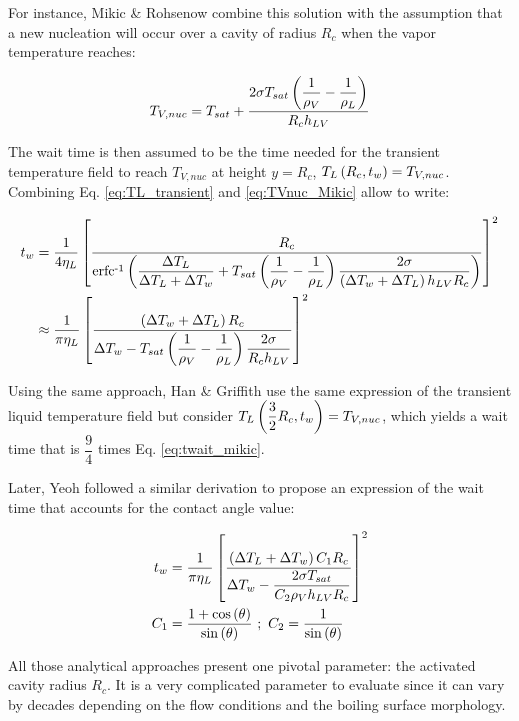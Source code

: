 For instance, Mikic \& Rohsenow \cite{mikic_bubble_1970} combine this solution with the assumption that a new nucleation will occur over a cavity of radius $R_{c}$ when the vapor temperature reaches:

\begin{equation}
T_{V,nuc} = T_{sat} + \frac{2\sigma T_{sat} \left( \dfrac{1}{\rho_{V}} - \dfrac{1}{\rho_{L}}  \right)}{R_{c}h_{LV}}
\label{eq:TVnuc_Mikic} 
\end{equation} 

The wait time is then assumed to be the time needed for the transient temperature field to reach $T_{V,nuc}$ at height $y=R_{c}$, \ie $T_{L}\left( R_{c},t_{w} \right)=T_{V,nuc}$. Combining Eq. \ref{eq:TL_transient} and \ref{eq:TVnuc_Mikic} allow to write:

\begin{align}
t_{w} &= \frac{1}{4\eta_{L}} \crocht{ \frac{R_{c}}{\erfcrec{ \dfrac{\Delta T_{L}}{\Delta T_{L} + \Delta T_{w}} + T_{sat} \parth{\dfrac{1}{\rho_{V}} - \dfrac{1}{\rho_{L}}}\dfrac{2\sigma }{ \parth{\Delta T_{w} + \Delta T_{L}}h_{LV}R_{c} } } } }^{2}\\
%
& \approx \frac{1}{\pi \eta_{L}}\crocht{\frac{ \parth{\Delta T_{w} + \Delta T_{L}}R_{c} }{\Delta T_{w} - T_{sat} \parth{\dfrac{1}{\rho_{V}} - \dfrac{1}{\rho_{L}}}\dfrac{2\sigma  }{R_{c} h_{LV}} } }^{2}
\label{eq:twait_mikic}
\end{align}

Using the same approach, Han \& Griffith \cite{chi-yeh_mechanism_1965} use the same expression of the transient liquid temperature field but consider $T_{L}\left( \dfrac{3}{2}R_{c},t_{w} \right)=T_{V,nuc}$, which yields a wait time that is $\dfrac{9}{4}$ times Eq. \ref{eq:twait_mikic}.

\npar

Later, Yeoh \etal \cite{yeoh_fundamental_2008} followed a similar derivation to propose an expression of the wait time that accounts for the contact angle value:

\begin{align}
t_{w} &= \frac{1}{\pi \eta_{L}}\crocht{ \frac{\parth{\Delta T_{L} + \Delta T_{w}} C_{1} R_{c}}{\Delta T_{w} - \dfrac{2\sigma T_{sat}}{C_{2}\rho_{V}h_{LV}R_{c}}}  }^{2}
\label{eq:twait_yeoh}\\
%
C_{1} &= \frac{1 + \cos{\theta} }{\sin{\theta}}\ ;\ C_{2} = \frac{1}{\sin{\theta}}
\end{align}

\npar

All those analytical approaches present one pivotal parameter: the activated cavity radius $R_{c}$. It is a very complicated parameter to evaluate since it can vary by decades depending on the flow conditions and the boiling surface morphology. 

